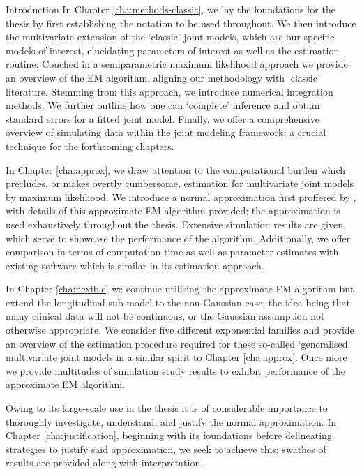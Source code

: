 \begin{chapter}{\label{cha:intro}Introduction}
  In Chapter \ref{cha:methods-classic}, we lay the foundations for the thesis by first establishing the notation to be used throughout. We then introduce the multivariate extension of the `classic' joint models, which are our specific models of interest, elucidating parameters of interest as well as the estimation routine. Couched in a semiparametric maximum likelihood approach we provide an overview of the EM algorithm, aligning our methodology with  `classic' literature. Stemming from this approach, we introduce numerical integration methods. We further outline how one can `complete' inference and obtain standard errors for a fitted joint model. Finally, we offer a comprehensive overview of simulating data within the joint modeling framework; a crucial technique for the forthcoming chapters.
  
  In Chapter \ref{cha:approx}, we draw attention to the computational burden which precludes, or makes overtly cumbersome, estimation for multivariate joint models by maximum likelihood. We introduce a normal approximation first proffered by \citet{Bernhardt15}, with details of this approximate EM algorithm provided; the approximation is used exhaustively throughout the thesis. Extensive simulation results are given, which serve to showcase the performance of the algorithm. Additionally, we offer comparison in terms of computation time as well as parameter estimates with existing software which is similar in its estimation approach.

  In Chapter \ref{cha:flexible} we continue utilising the approximate EM algorithm but extend the longitudinal sub-model to the non-Gaussian case; the idea being that many clinical data will not be continuous, or the Gaussian assumption not otherwise appropriate. We consider five different exponential families and provide an overview of the estimation procedure required for these so-called `generalised' multivariate joint models in a similar spirit to Chapter \ref{cha:approx}. Once more we provide multitudes of simulation study results to exhibit performance of the approximate EM algorithm.

  Owing to its large-scale use in the thesis it is of considerable importance to thoroughly investigate, understand, and justify the normal approximation. In Chapter \ref{cha:justification}, beginning with its foundations before delineating strategies to justify said approximation, we seek to achieve this; swathes of results are provided along with interpretation.


\end{chapter}

